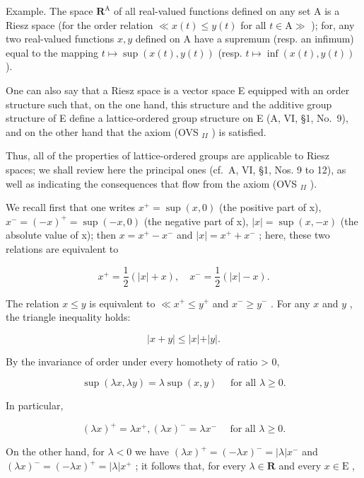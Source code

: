 Example. The space \(\mathbf{R}^{\mathrm{A}}\) of all real-valued functions defined on any set A is a Riesz space (for the order relation \(\ll x(t) \leqslant y(t)\) for all \(t \in \mathrm{A} \gg\) ); for, any two real-valued functions \(x, y\) defined on A have a supremum (resp. an infimum) equal to the mapping \(t \mapsto \sup(x(t), y(t))\) (resp. \(t \mapsto \inf(x(t), y(t))\) ).

One can also say that a Riesz space is a vector space E equipped with an order structure such that, on the one hand, this structure and the additive group structure of E define a lattice-ordered group structure on E (A, VI, §1, No.~9), and on the other hand that the axiom (OVS \(_{II}\) ) is satisfied.

Thus, all of the properties of lattice-ordered groups are applicable to Riesz spaces; we shall review here the principal ones (cf.~A, VI, §1, Nos. 9 to 12), as well as indicating the consequences that flow from the axiom (OVS \(_{II}\) ).

We recall first that one writes \(x^{+} = \sup(x,0)\) (the positive part of x), \(x^{-} = (-x)^{+} = \sup(-x,0)\) (the negative part of x), \(|x| = \sup(x,-x)\) (the absolute value of x); then \(x = x^{+} - x^{-}\) and \(|x| = x^{+} + x^{-}\) ; here, these two relations are equivalent to

\[
x ^ {+} = \frac {1}{2} (| x | + x), \quad x ^ {-} = \frac {1}{2} (| x | - x).
\]

The relation \(x \leqslant y\) is equivalent to \(\ll x^{+} \leqslant y^{+}\) and \(x^{-} \geqslant y^{-}\) . For any \(x\) and \(y\) , the triangle inequality holds:

\[
\vert x + y \vert \leqslant \vert x \vert + \vert y \vert .\tag{1}
\]

By the invariance of order under every homothety of ratio \textgreater{} 0,

\[
\sup (\lambda x, \lambda y) = \lambda \sup (x, y) \quad \text { for   all } \lambda \geqslant 0.\tag{2}
\]

In particular,

\[
(\lambda x) ^ {+} = \lambda x ^ {+}, (\lambda x) ^ {-} = \lambda x ^ {-} \quad \text { for   all } \lambda \geqslant 0.\tag{3}
\]

On the other hand, for \(\lambda < 0\) we have \((\lambda x)^{+} = (-\lambda x)^{-} = |\lambda |x^{-}\) and \((\lambda x)^{-} = (-\lambda x)^{+} = |\lambda |x^{+}\) ; it follows that, for every \(\lambda \in \mathbf{R}\) and every \(x\in \mathrm{E}\) ,

